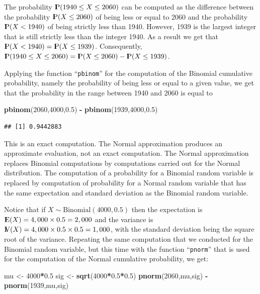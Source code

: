 \documentclass[]{krantz}
\makeatletter
\newenvironment{Shaded}{\begin{snugshade}}{\end{snugshade}}
\newcommand{\KeywordTok}[1]{\textcolor[rgb]{0.13,0.29,0.53}{\textbf{#1}}}
\newcommand{\DecValTok}[1]{\textcolor[rgb]{0.00,0.00,0.81}{#1}}
\newcommand{\FloatTok}[1]{\textcolor[rgb]{0.00,0.00,0.81}{#1}}
\newcommand{\StringTok}[1]{\textcolor[rgb]{0.31,0.60,0.02}{#1}}
\newcommand{\OperatorTok}[1]{\textcolor[rgb]{0.81,0.36,0.00}{\textbf{#1}}}
\newcommand{\NormalTok}[1]{#1}
\newcommand{\Expec}{{\rm I\kern-.3em E}}
\newcommand{\Prob}{{\rm I\kern-.3em P}}
\newcommand{\Var}{{\rm I\kern-.3em V}}
\newenvironment{kframe}{%
\medskip{}
\setlength{\fboxsep}{.8em}
 \def\at@end@of@kframe{}%
 \ifinner\ifhmode%
  \def\at@end@of@kframe{\end{minipage}}%
  \begin{minipage}{\columnwidth}%
 \fi\fi%
 \def\FrameCommand##1{\hskip\@totalleftmargin \hskip-\fboxsep
 \colorbox{shadecolor}{##1}\hskip-\fboxsep
     \hskip-\linewidth \hskip-\@totalleftmargin \hskip\columnwidth}%
 \MakeFramed {\advance\hsize-\width
   \@totalleftmargin\z@ \linewidth\hsize
   \@setminipage}}%
 {\par\unskip\endMakeFramed%
 \at@end@of@kframe}
\renewenvironment{Shaded}{\begin{kframe}}{\end{kframe}}
\theoremstyle{definition}
\theoremstyle{definition}
\theoremstyle{definition}
\theoremstyle{remark}
\makeatother
\begin{document}
The probability \(\Prob(1940 \leq X \leq 2060)\) can be computed as the
difference between the probability \(\Prob(X \leq 2060)\) of being less
or equal to 2060 and the probability \(\Prob(X < 1940)\) of being
strictly less than 1940. However, 1939 is the largest integer that is
still strictly less than the integer 1940. As a result we get that
\(\Prob(X < 1940) = \Prob(X \leq 1939)\). Consequently,
\(\Prob(1940 \leq X \leq 2060) = \Prob(X \leq 2060) - \Prob(X \leq 1939)\).

Applying the function ``\texttt{pbinom}'' for the computation of the
Binomial cumulative probability, namely the probability of being less or
equal to a given value, we get that the probability in the range between
1940 and 2060 is equal to

\begin{Shaded}
\begin{Highlighting}[]
\KeywordTok{pbinom}\NormalTok{(}\DecValTok{2060}\NormalTok{,}\DecValTok{4000}\NormalTok{,}\FloatTok{0.5}\NormalTok{) }\OperatorTok{-}\StringTok{ }\KeywordTok{pbinom}\NormalTok{(}\DecValTok{1939}\NormalTok{,}\DecValTok{4000}\NormalTok{,}\FloatTok{0.5}\NormalTok{)}
\end{Highlighting}
\end{Shaded}

\begin{verbatim}
## [1] 0.9442883
\end{verbatim}

This is an exact computation. The Normal approximation produces an
approximate evaluation, not an exact computation. The Normal
approximation replaces Binomial computations by computations carried out
for the Normal distribution. The computation of a probability for a
Binomial random variable is replaced by computation of probability for a
Normal random variable that has the same expectation and standard
deviation as the Binomial random variable.

Notice that if \(X \sim \mathrm{Binomial}(4000,0.5)\) then the
expectation is \(\Expec(X) = 4,000 \times 0.5 = 2,000\) and the variance
is \(\Var(X) = 4,000 \times 0.5 \times 0.5 = 1,000\), with the standard
deviation being the square root of the variance. Repeating the same
computation that we conducted for the Binomial random variable, but this
time with the function ``\texttt{pnorm}'' that is used for the
computation of the Normal cumulative probability, we get:

\begin{Shaded}
\begin{Highlighting}[]
\NormalTok{mu <-}\StringTok{ }\DecValTok{4000}\OperatorTok{*}\FloatTok{0.5}
\NormalTok{sig <-}\StringTok{ }\KeywordTok{sqrt}\NormalTok{(}\DecValTok{4000}\OperatorTok{*}\FloatTok{0.5}\OperatorTok{*}\FloatTok{0.5}\NormalTok{)}
\KeywordTok{pnorm}\NormalTok{(}\DecValTok{2060}\NormalTok{,mu,sig) }\OperatorTok{-}\StringTok{ }\KeywordTok{pnorm}\NormalTok{(}\DecValTok{1939}\NormalTok{,mu,sig)}
\end{Highlighting}
\end{Shaded}
\end{document}
